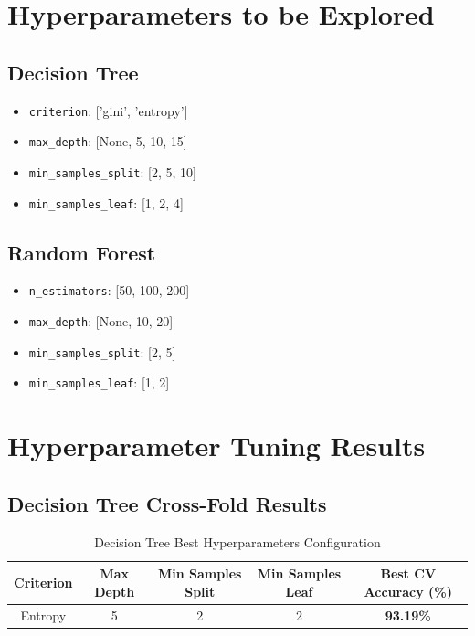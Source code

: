\documentclass[11pt]{article}
\begin{document}

\section*{Hyperparameters to be Explored}

\subsection*{Decision Tree}
\begin{itemize}
    \item \texttt{criterion}: ['gini', 'entropy']
    \item \texttt{max\_depth}: [None, 5, 10, 15]
    \item \texttt{min\_samples\_split}: [2, 5, 10]
    \item \texttt{min\_samples\_leaf}: [1, 2, 4]
\end{itemize}

\subsection*{Random Forest}
\begin{itemize}
    \item \texttt{n\_estimators}: [50, 100, 200]
    \item \texttt{max\_depth}: [None, 10, 20]
    \item \texttt{min\_samples\_split}: [2, 5]
    \item \texttt{min\_samples\_leaf}: [1, 2]
\end{itemize}


\section*{Hyperparameter Tuning Results}

\subsection*{Decision Tree Cross-Fold Results}
\begin{table}[H]
\centering
\caption{Decision Tree Best Hyperparameters Configuration}
\begin{tabular}{ccccc}
\toprule
Criterion & Max Depth & Min Samples Split & Min Samples Leaf & Best CV Accuracy (\%) \\
\midrule
Entropy & 5 & 2 & 2 & \textbf{93.19\%} \\
\bottomrule
\end{tabular}
\end{table}
\end{document}
